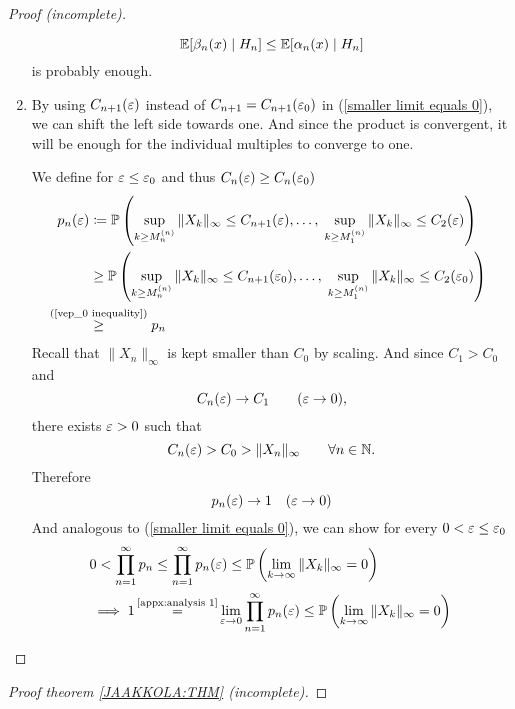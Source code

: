 \begin{proof}[Proof (incomplete)]
\begin{enumerate}[label= Step \arabic*:, ref= Step \arabic*, leftmargin=0pt]
    \[
        \mathbb{E}[\beta_n(x)\mid H_n]\le \mathbb{E}[\alpha_n(x)\mid H_n]
    \]
    is probably enough.
    \item By using \(C_{n+1}(\varepsilon)\) instead of \(C_{n+1}=C_{n+1}(\varepsilon_0)\) in (\ref{smaller limit equals 0}), we can shift the left side towards one. And since the product is convergent, it will be enough for the individual multiples to converge to one. 
    
    We define for \(\varepsilon \le \varepsilon_0\) and thus \(C_n(\varepsilon)\ge C_n(\varepsilon_0) \)
    \begin{align*}
        p_n(\vep)&\coloneqq \Pr\left(
            \sup_{k\ge M_n^{(n)}}\|X_k\|_\infty \le C_{n+1}(\vep),\dots,\;
            \sup_{k\ge M_1^{(n)}}\|X_k\|_\infty \le C_{2}(\vep)
        \right)\\
        &\ge \Pr\left(
            \sup_{k\ge M_n^{(n)}}\|X_k\|_\infty \le C_{n+1}(\vep_0),\dots,\;
            \sup_{k\ge M_1^{(n)}}\|X_k\|_\infty \le C_{2}(\vep_0)
        \right)\\
        &\lxgq{\text{(\ref{vep_0 inequality})}} p_n
    \end{align*}
    Recall that \(\|X_n\|_\infty\) is kept smaller than \(C_0\) by scaling. And since \(C_1>C_0\) and 
    \[
        C_n(\varepsilon)\to C_1 \qquad (\varepsilon \to 0),
    \]
    there exists \(\varepsilon>0\) such that 
    \[
        C_n(\varepsilon)>C_0>\|X_n\|_\infty \qquad \forall n\in\mathbb{N}.
    \]
    Therefore 
    \[
        p_n(\varepsilon)\to 1 \quad (\varepsilon\to 0)
    \]
    And analogous to (\ref{smaller limit equals 0}), we can show for every \(0<\varepsilon\le\varepsilon_0\)
    \begin{align*}
        &0<\prod_{n=1}^\infty p_n 
        \le \prod_{n=1}^\infty p_n(\vep)
        \le \Pr\left( \lim_{k\to\infty}\|X_k\|_\infty=0 \right)\\
        &\implies 1\xeq{\text{\ref{appx:analysis 1}}}\lim_{\vep\to 0}\prod_{n=1}^\infty p_n(\vep)
        \le \Pr\left( \lim_{k\to\infty}\|X_k\|_\infty=0 \right)\qedhere
    \end{align*}
\end{enumerate}
\end{proof}

\begin{proof}[Proof theorem \ref{JAAKKOLA:THM} (incomplete)]
    
\end{proof}

\endinput